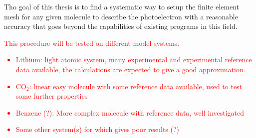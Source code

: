 Tho goal of this thesis is to find a systematic way to setup the finite element mesh for any given molecule to describe the photoelectron with a reasonable accuracy that goes beyond the capabilities of existing programs in this field.
\textcolor{red}{
This procedure will be tested on different model systems.
\begin{itemize}
   \item Lithium: light atomic system, many experimental and experimental reference data available, the  calculations are expected to give a good approximation.
   \item CO$_2$: linear easy molecule with some reference data available, used to test some further properties 
   \item Benzene (?): More complex molecule with reference data, well investigated
   \item Some other system(s) for which  gives poor results (?)
\end{itemize}
}
